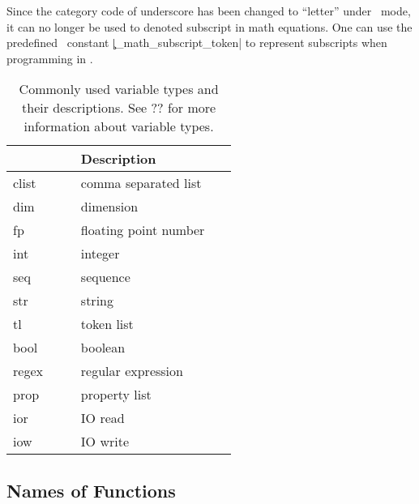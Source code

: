 \documentclass{ltugboat}
\begin{document}
Since the category code of underscore has been changed to ``letter'' under \liii\ mode, it can no longer be used to denoted subscript in math equations.
One can use the predefined \liii\ constant \inltex|\c_math_subscript_token| to represent subscripts when programming in \liii.

\begin{table}[htpb]
\centering
\scriptsize
\begin{tabular}{>{\ttfamily\centering}p{0.15\linewidth}p{0.4\linewidth}}
\toprule
\multicolumn{1}{c}{Type} & Description\\ \midrule
clist & comma separated list\\
dim & dimension\\
fp & floating point number\\
int & integer\\
seq & sequence\\
str & string\\
tl & token list\\
bool & boolean\\
regex & regular expression\\
prop & property list\\
ior & IO read\\
iow & IO write\\ \bottomrule
\end{tabular}
\caption{Commonly used variable types and their descriptions. See ?? for more information about variable types.}
\label{tbl:var-type}
\end{table}

\subsection{Names of Functions}
\end{document}
